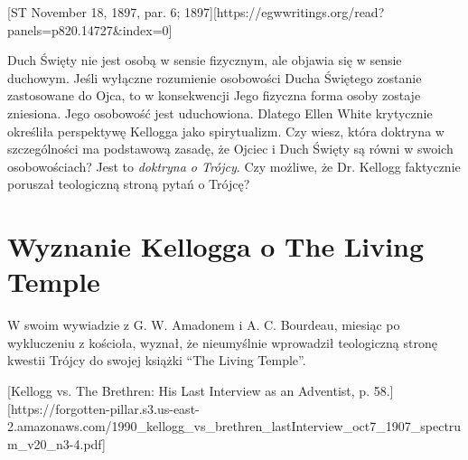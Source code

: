 [ST November 18, 1897, par. 6; 1897][https://egwwritings.org/read?panels=p820.14727&index=0]

Duch Święty nie jest osobą w sensie fizycznym, ale objawia się w sensie duchowym. Jeśli wyłączne rozumienie osobowości Ducha Świętego zostanie zastosowane do Ojca, to w konsekwencji Jego fizyczna forma osoby zostaje zniesiona. Jego osobowość jest uduchowiona. Dlatego Ellen White krytycznie określiła perspektywę Kellogga jako spirytualizm. Czy wiesz, która doktryna w szczególności ma podstawową zasadę, że Ojciec i Duch Święty są równi w swoich osobowościach? Jest to \textit{doktryna o Trójcy}. Czy możliwe, że Dr. Kellogg faktycznie poruszał teologiczną stroną pytań o Trójcę?

\section*{Wyznanie Kellogga o The Living Temple}

W swoim wywiadzie z G. W. Amadonem i A. C. Bourdeau, miesiąc po wykluczeniu z kościoła, wyznał, że nieumyślnie wprowadził teologiczną stronę kwestii Trójcy do swojej książki “The Living Temple”.

[Kellogg vs. The Brethren: His Last Interview as an Adventist, p. 58.][https://forgotten-pillar.s3.us-east-2.amazonaws.com/1990\_kellogg\_vs\_brethren\_lastInterview\_oct7\_1907\_spectrum\_v20\_n3-4.pdf]


